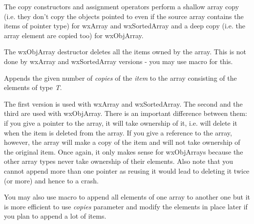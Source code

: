 


The copy constructors and assignment operators perform a shallow array copy
(i.e. they don't copy the objects pointed to even if the source array contains
the items of pointer type) for wxArray and wxSortedArray and a deep copy (i.e.
the array element are copied too) for wxObjArray.

\label{wxarraydtor}




The wxObjArray destructor deletes all the items owned by the array. This is not
done by wxArray and wxSortedArray versions - you may use 
 macro for this.

\label{wxarrayadd}




Appends the given number of {\it copies} of the {\it item} to the array
consisting of the elements of type {\it T}.

The first version is used with wxArray and wxSortedArray. The second and the
third are used with wxObjArray. There is an important difference between
them: if you give a pointer to the array, it will take ownership of it, i.e.
will delete it when the item is deleted from the array. If you give a reference
to the array, however, the array will make a copy of the item and will not take
ownership of the original item. Once again, it only makes sense for wxObjArrays
because the other array types never take ownership of their elements. Also note
that you cannot append more than one pointer as reusing it would lead to
deleting it twice (or more) and hence to a crash.

You may also use  macro to append all
elements of one array to another one but it is more efficient to use 
{\it copies} parameter and modify the elements in place later if you plan to
append a lot of items.

